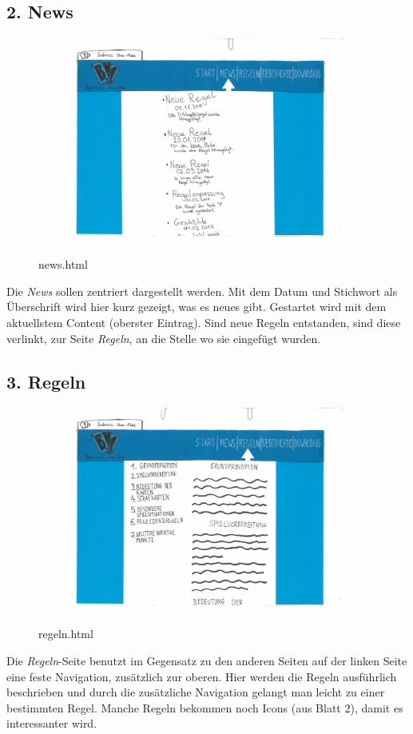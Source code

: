 \documentclass{scrartcl}
\begin{document}
  \subsection*{2. News}
  \begin{figure}[H]
 \begin{center}
 \includegraphics[width=0.9\textwidth]{news.jpg}
\caption{news.html}
 \end{center}
\end{figure}  
  Die \textit{News} sollen zentriert dargestellt werden. Mit dem Datum und Stichwort als Überschrift wird hier kurz gezeigt, was es neues gibt. Gestartet wird mit dem aktuellstem Content (oberster Eintrag). Sind neue Regeln entstanden, sind diese verlinkt, zur Seite \textit{Regeln}, an die Stelle wo sie eingefügt wurden.
  \subsection*{3. Regeln}
  \begin{figure}[H]
 \begin{center}
 \includegraphics[width=0.9\textwidth]{regeln.jpg}
\caption{regeln.html}
 \end{center}
\end{figure}  
Die \textit{Regeln}-Seite benutzt im Gegensatz zu den anderen Seiten auf der linken Seite eine feste Navigation, zusätzlich zur oberen. Hier werden die Regeln ausführlich beschrieben und durch die zusätzliche Navigation gelangt man leicht zu einer bestimmten Regel. Manche Regeln bekommen noch Icons (aus Blatt 2), damit es interessanter wird.
\end{document}
